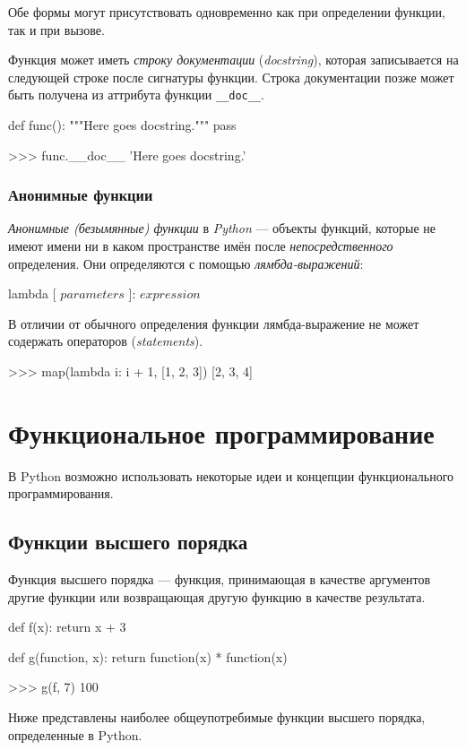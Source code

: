 Обе формы могут присутствовать одновременно как при определении функции, так и при вызове.

Функция может иметь \emph{строку документации} (\emph{docstring}), которая записывается на следующей строке после сигнатуры функции. Строка документации позже может быть получена из аттрибута функции \lstinline{__doc__}.
\begin{pylst}{}{}
def func():
   """Here goes docstring."""
   pass

>>> func.__doc__
'Here goes docstring.'
\end{pylst}

\subsubsection{Анонимные функции}
\emph{Анонимные (безымянные) функции} в \emph{Python} — объекты функций, которые не имеют имени ни в каком пространстве имён после \emph{непосредственного} определения. Они определяются с помощью \emph{лямбда-выражений}:
\begin{pylst}{}{}
lambda [ $parameters$ ]: $expression$
\end{pylst}

В отличии от обычного определения функции лямбда-выражение не может содержать операторов (\emph{statements}).
\begin{pylst}{}{}
>>> map(lambda i: i + 1, [1, 2, 3])
[2, 3, 4]
\end{pylst}

\section{Функциональное программирование}
В Python возможно использовать некоторые идеи и концепции функционального программирования.

\subsection{Функции высшего порядка}
Функция высшего порядка --- функция, принимающая в качестве аргументов другие функции или возвращающая другую функцию в качестве результата.
\begin{pylst}{}{}
def f(x):
    return x + 3
 
def g(function, x):
    return function(x) * function(x)
 
>>> g(f, 7)
100
\end{pylst}

Ниже представлены наиболее общеупотребимые функции высшего порядка, определенные в Python.

